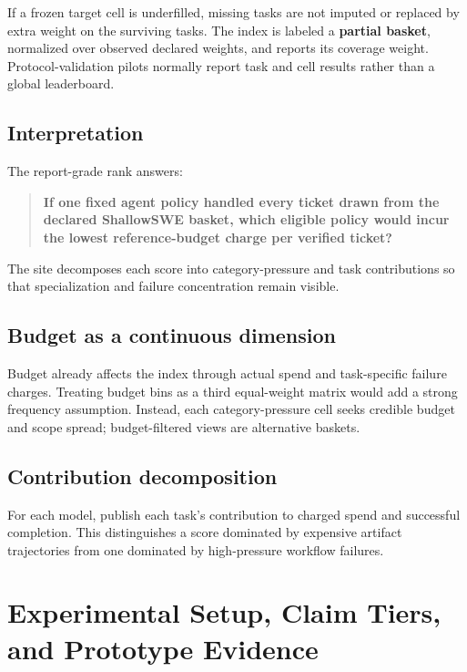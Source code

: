 \documentclass[11pt]{article}
\begin{document}
If a frozen target cell is underfilled, missing tasks are not imputed or replaced by extra weight on the surviving tasks. The index is labeled a \textbf{partial basket}, normalized over observed declared weights, and reports its coverage weight. Protocol-validation pilots normally report task and cell results rather than a global leaderboard.

\subsection{Interpretation}\hypertarget{92-interpretation}{}\label{92-interpretation}

The report-grade rank answers:

\begin{quote}
\textbf{If one fixed agent policy handled every ticket drawn from the declared ShallowSWE basket, which eligible policy would incur the lowest reference-budget charge per verified ticket?}
\end{quote}

The site decomposes each score into category-pressure and task contributions so that specialization and failure concentration remain visible.

\subsection{Budget as a continuous dimension}\hypertarget{93-budget-as-a-continuous-dimension}{}\label{93-budget-as-a-continuous-dimension}

Budget already affects the index through actual spend and task-specific failure charges. Treating budget bins as a third equal-weight matrix would add a strong frequency assumption. Instead, each category-pressure cell seeks credible budget and scope spread; budget-filtered views are alternative baskets.

\subsection{Contribution decomposition}\hypertarget{94-contribution-decomposition}{}\label{94-contribution-decomposition}

For each model, publish each task's contribution to charged spend and successful completion. This distinguishes a score dominated by expensive artifact trajectories from one dominated by high-pressure workflow failures.

\section{Experimental Setup, Claim Tiers, and Prototype Evidence}\hypertarget{10-experimental-setup-claim-tiers-and-prototype-evidence}{}\label{10-experimental-setup-claim-tiers-and-prototype-evidence}
\end{document}
